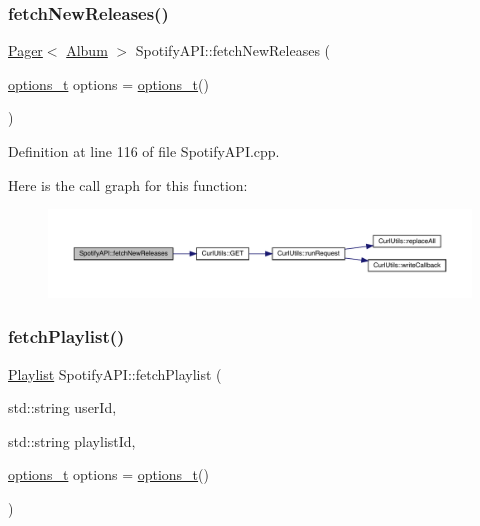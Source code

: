 \subsubsection{\texorpdfstring{fetch\+New\+Releases()}{fetchNewReleases()}}
{\footnotesize\ttfamily \mbox{\hyperlink{class_pager}{Pager}}$<$ \mbox{\hyperlink{class_album}{Album}} $>$ Spotify\+A\+P\+I\+::fetch\+New\+Releases (\begin{DoxyParamCaption}\item[{\mbox{\hyperlink{_spotify_a_p_i_8h_a0ff5cac1a4007bb330b7d9939650c283}{options\+\_\+t}}}]{options = {\ttfamily \mbox{\hyperlink{_spotify_a_p_i_8h_a0ff5cac1a4007bb330b7d9939650c283}{options\+\_\+t}}()} }\end{DoxyParamCaption})}



Definition at line 116 of file Spotify\+A\+P\+I.\+cpp.

Here is the call graph for this function\+:
\nopagebreak
\begin{figure}[H]
\begin{center}
\leavevmode
\includegraphics[width=350pt]{class_spotify_a_p_i_a04e6f0cef6120d389a29a760bb883ee0_cgraph}
\end{center}
\end{figure}
\mbox{\label{class_spotify_a_p_i_a1d4dc0e62ce453938965fcbd4d6ddf8c}} 
\subsubsection{\texorpdfstring{fetch\+Playlist()}{fetchPlaylist()}}
{\footnotesize\ttfamily \mbox{\hyperlink{class_playlist}{Playlist}} Spotify\+A\+P\+I\+::fetch\+Playlist (\begin{DoxyParamCaption}\item[{std\+::string}]{user\+Id,  }\item[{std\+::string}]{playlist\+Id,  }\item[{\mbox{\hyperlink{_spotify_a_p_i_8h_a0ff5cac1a4007bb330b7d9939650c283}{options\+\_\+t}}}]{options = {\ttfamily \mbox{\hyperlink{_spotify_a_p_i_8h_a0ff5cac1a4007bb330b7d9939650c283}{options\+\_\+t}}()} }\end{DoxyParamCaption})}



